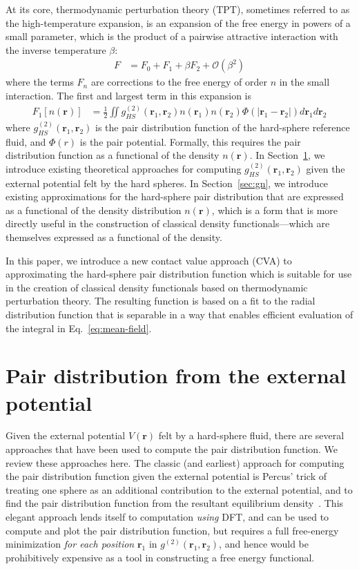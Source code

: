 \documentclass[letterpaper,twocolumn,amsmath,amssymb,pre,aps,10pt]{revtex4-1}
\newcommand{\rr}{\textbf{r}}
\begin{document}
At its core, thermodynamic perturbation theory (TPT), sometimes referred to
as the high-temperature expansion, is an expansion of the
free energy in powers of a small parameter, which is the
product of a
pairwise attractive interaction with the inverse temperature $\beta$:
\begin{align}
  F &= F_0 + F_1 + \beta F_2 + \mathcal{O}(\beta^2)
\end{align}
where the terms $F_n$ are corrections to the free energy of order $n$
in the small interaction.  The first and largest term in this
expansion is
\begin{align}
  F_1[n(\rr)] &= \tfrac12 \iint \!\!
  g^{(2)}_{HS}(\rr_1,\rr_2)n(\rr_1)n(\rr_2)\Phi(|\rr_1-\rr_2|)
  d\rr_1d\rr_2
  \label{eq:mean-field}
\end{align}
where $g^{(2)}_{HS}(\rr_1,\rr_2)$ is the pair distribution function of
the hard-sphere reference fluid, and $\Phi(r)$ is the pair potential.
Formally, this requires the pair distribution function as a functional
of the density $n(\rr)$.  In Section~\ref{sec:gV}, we introduce
existing theoretical approaches for computing
$g^{(2)}_{HS}(\rr_1,\rr_2)$ given the external potential felt by the
hard spheres.  In Section~\ref{sec:gn}, we introduce existing
approximations for the hard-sphere pair distribution that are
expressed as a functional of the density distribution $n(\rr)$, which
is a form that is more directly useful in the construction of
classical density functionals---which are themselves expressed as a
functional of the density.

In this paper, we introduce a new contact value approach
(CVA) to approximating the hard-sphere pair distribution function
which is suitable for use in the creation of classical density
functionals based on thermodynamic perturbation theory. The resulting
function is based on a fit to the radial distribution function that is
separable in a way that enables efficient evaluation of the
integral in Eq.~\ref{eq:mean-field}.

\section{Pair distribution from the external potential}\label{sec:gV}

Given the external potential $V(\rr)$ felt by a hard-sphere fluid,
there are several approaches that have been used to compute the pair
distribution function.  We review these approaches here.  The
classic (and earliest) approach for computing the pair distribution
function given the external potential is Percus' trick of treating one
sphere as an additional contribution to the external potential, and to
find the pair distribution function from the resultant equilibrium
density~\cite{hansen2006theory}.  This elegant approach lends itself
to computation \emph{using} DFT, and can be used to compute and plot the pair
distribution function, but requires a full free-energy minimization
\emph{for each position} $\rr_1$ in $g^{(2)}(\rr_1,\rr_2)$, and hence
would be prohibitively expensive as a tool in constructing a free
energy functional.
\end{document}
